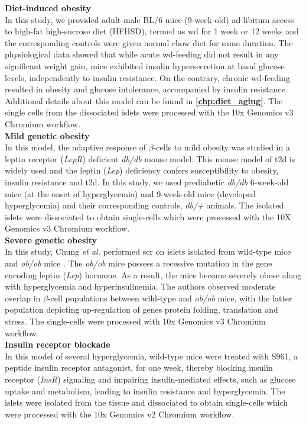 \textbf{Diet-induced obesity\\}
In this study, we provided adult male BL/6 mice (9-week-old) ad-libitum access to high-fat high-sucrose diet (HFHSD), termed as \acrfull{wd} for 1 week or 12 weeks and the corresponding controls were given normal chow diet for same duration. The physiological data showed that while acute \gls{wd}-feeding did not result in any significant weight gain, mice exhibited insulin hypersecretion at basal glucose levels, independently to insulin resistance. On the contrary, chronic \gls{wd}-feeding resulted in obesity and glucose intolerance, accompanied by insulin resistance. Additional details about this model can be found in \textbf{\autoref{chp:diet_aging}}. The single cells from the dissociated islets were processed with the 10x Genomics v3 Chromium workflow.\\

\textbf{Mild genetic obesity\\}
In this model, the adaptive response of $\beta$-cells to mild obesity was studied in a leptin receptor (\textit{LepR}) deficient \textit{db/db} mouse model. This mouse model of \gls{t2d} is widely used and the leptin (\textit{Lep}) deficiency confers susceptibility to obesity, insulin resistance and \gls{t2d}. In this study, we used prediabetic \textit{db/db} 6-week-old mice (at the onset of hyperglycemia) and 9-week-old mice (developed hyperglycemia) and their corresponding controls, \textit{db/+} animals. The isolated islets were dissociated to obtain single-cells which were processed with the 10X Genomics v3 Chromium workflow.\\

\textbf{Severe genetic obesity\\}
In this study, Chung \textit{et al.} performed \gls{scr} on islets isolated from wild-type mice and \textit{ob/ob} mice \textbf{\cite{chung_endocrine-exocrine_2020}}. The \textit{ob/ob} mice possess a recessive mutation in the gene encoding leptin (\textit{Lep}) hormone. As a result, the mice become severely obese along with hyperglycemia and hyperinsulinemia. The authors observed moderate overlap in $\beta$-cell populations between wild-type and \textit{ob/ob} mice, with the latter population depicting up-regulation of genes protein folding, translation and  stress. The single-cells were processed with 10x Genomics v3 Chromium workflow.\\

\textbf{Insulin receptor blockade\\}
In this model of several hyperglycemia, wild-type mice were treated with S961, a peptide insulin receptor antagonist, for one week, thereby blocking insulin receptor (\textit{InsR}) signaling and impairing insulin-mediated effects, such as glucose uptake and metabolism, leading to insulin resistance and hyperglycemia. The islets were isolated from the tissue and dissociated to obtain single-cells which were processed with the 10x Genomics v2 Chromium workflow.\\

